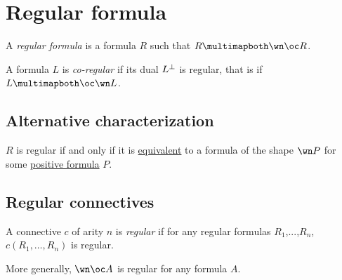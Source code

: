\section{Regular formula}\label{regular-formula}

A \emph{regular formula} is a formula \(R\) such that
\(R\linequiv\wn\oc R\).

A formula \(L\) is \emph{co-regular} if its dual \(L^\bot\) is regular,
that is if \(L\linequiv\oc\wn L\).

\subsection{Alternative
characterization}\label{alternative-characterization}

\(R\) is regular if and only if it is
\href{Sequent_calculus\#Equivalences}{equivalent} to a formula of the
shape \(\wn P\) for some \href{positive_formula}{positive formula}
\(P\).

\subsection{Regular connectives}\label{regular-connectives}

A connective \(c\) of arity \(n\) is \emph{regular} if for any regular
formulas \(R_1\),...,\(R_n\), \(c(R_1,\dots,R_n)\) is regular.

More generally, \(\wn\oc A\) is regular for any formula \(A\).

